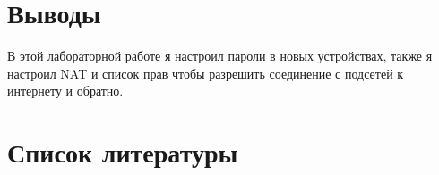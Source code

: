 \documentclass[
  english,
  russian,
  12pt,
  a4paper,
  DIV=11,
  numbers=noendperiod]{scrreprt}
\begin{document}
\chapter{Выводы}\label{ux432ux44bux432ux43eux434ux44b}

В этой лабораторной работе я настроил пароли в новых устройствах, также
я настроил NAT и список прав чтобы разрешить соединение с подсетей к
интернету и обратно.

\chapter*{Список
литературы}\label{ux441ux43fux438ux441ux43eux43a-ux43bux438ux442ux435ux440ux430ux442ux443ux440ux44b}

\printbibliography[heading=none]
\end{document}
